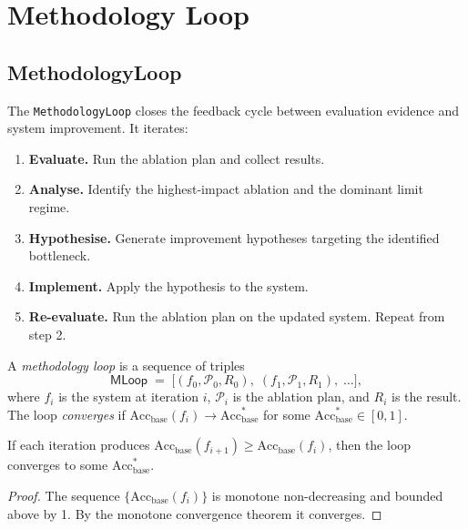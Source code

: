 \documentclass[11pt]{article}
\newcommand{\Acc}{\mathrm{Acc}}             %
\newcommand{\AccBase}{\Acc_{\mathrm{base}}} %
\newcommand{\MethodLoop}{\mathsf{MLoop}}    %
\begin{document}
\section{Methodology Loop}
\label{sec:methodology-loop}

\subsection{MethodologyLoop}
\label{subsec:methodology-loop}

The \texttt{MethodologyLoop} closes the feedback cycle between
evaluation evidence and system improvement.  It iterates:
\begin{enumerate}
\item \textbf{Evaluate.}  Run the ablation plan and collect results.
\item \textbf{Analyse.}  Identify the highest-impact ablation and the
  dominant limit regime.
\item \textbf{Hypothesise.}  Generate improvement hypotheses
  targeting the identified bottleneck.
\item \textbf{Implement.}  Apply the hypothesis to the system.
\item \textbf{Re-evaluate.}  Run the ablation plan on the updated
  system.  Repeat from step 2.
\end{enumerate}

\begin{definition}
\label{def:methodology-loop}
A \emph{methodology loop} is a sequence of triples
\[
  \MethodLoop \;=\;
  \bigl[(f_0, \mathcal{P}_0, R_0),\;
        (f_1, \mathcal{P}_1, R_1),\;
        \ldots\bigr],
\]
where $f_i$ is the system at iteration $i$, $\mathcal{P}_i$ is the
ablation plan, and $R_i$ is the result.  The loop \emph{converges} if
$\AccBase(f_i) \to \AccBase^*$ for some $\AccBase^* \in [0,1]$.
\end{definition}

\begin{proposition}
\label{prop:monotone-improvement}
If each iteration produces $\AccBase(f_{i+1}) \geq \AccBase(f_i)$, then
the loop converges to some $\AccBase^*$.
\end{proposition}

\begin{proof}
The sequence $\{\AccBase(f_i)\}$ is monotone non-decreasing and bounded
above by 1.  By the monotone convergence theorem it converges.
\end{proof}
\end{document}

